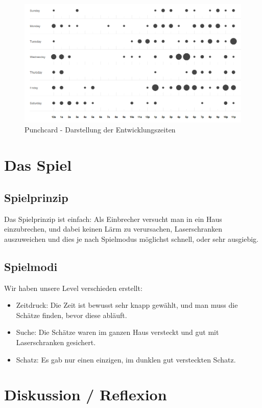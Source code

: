 \documentclass[11pt,a4paper]{scrbook}
\begin{document}
\begin{figure}[h]
\centering
\includegraphics[scale=0.4]{img/punchcard.png}
\caption{Punchcard - Darstellung der Entwicklungszeiten}
\label{fig:punchcard}
\end{figure}

\chapter{Das Spiel}
\section{Spielprinzip}
Das Spielprinzip ist einfach: Als Einbrecher versucht man in ein Haus einzubrechen, und dabei keinen Lärm zu verursachen, Laserschranken auszuweichen
und dies je nach Spielmodus möglichst schnell, oder sehr ausgiebig.

\section{Spielmodi}
Wir haben unsere Level verschieden erstellt:
\begin{itemize}
\item Zeitdruck: Die Zeit ist bewusst sehr knapp gewählt, und man muss die Schätze finden, bevor diese abläuft.
\item Suche: Die Schätze waren im ganzen Haus versteckt und gut mit Laserschranken gesichert.
\item Schatz: Es gab nur einen einzigen, im dunklen gut versteckten Schatz.
\end{itemize}

\chapter{Diskussion / Reflexion}
\end{document}
